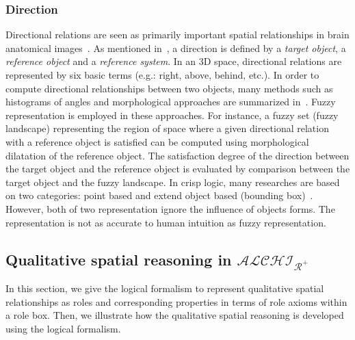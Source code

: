 \documentclass{article}
\begin{document}
\subsubsection{Direction}
Directional relations are seen as primarily important spatial relationships in brain anatomical images~\cite{Bloch2005fuzzy,fouquier2012sequential,Hudelot2008fuzzy,nempont2013constraint}.
As mentioned in~\cite{Bloch2005fuzzy}, a direction is defined by a \textit{target object}, a \textit{reference object} and a \textit{reference system}.
In an 3D space, directional relations are represented by six basic terms (e.g.: right, above, behind, etc.).
In order to compute directional relationships between two objects, many methods such as histograms of angles and morphological approaches are summarized in~\cite{Bloch2005fuzzy}.
Fuzzy representation is employed in these approaches. 
For instance, a fuzzy set (fuzzy landscape) representing the region of space where a given directional relation with a reference object is satisfied 
can be computed using morphological dilatation of the reference object.
The satisfaction degree of the direction between the target object and the reference object is evaluated by comparison between the target object and the fuzzy landscape.
In crisp logic, many researches are based on two categories: point based and extend object based (bounding box)~\cite{chen2013survey}.
However, both of two representation ignore the influence of objects forms. The representation is not as accurate to human intuition as fuzzy representation.
% 
% 

\subsection{Qualitative spatial reasoning in $\mathcal{ALCHI_{R^+}}$}
In this section, we give the logical formalism to represent qualitative spatial relationships as roles and  corresponding properties in terms of role axioms within a role box.
Then, we illustrate how the qualitative spatial reasoning is developed using the logical formalism. 
\end{document}
